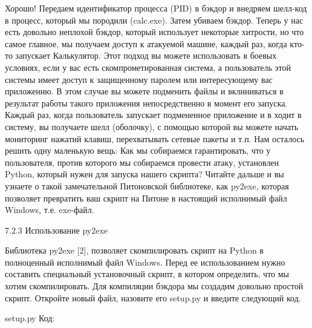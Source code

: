 \documentclass[12pt]{book}
\begin{document}

Хорошо! Передаем идентификатор процесса (PID) в бэкдор и внедряем шелл-код в процесс, который мы породили (calc.exe). Затем убиваем бэкдор. Теперь у нас есть довольно неплохой бэкдор, который использует некоторые хитрости, но что самое главное, мы получаем доступ к атакуемой машине, каждый раз, когда кто-то запускает Калькулятор. Этот подход вы можете использовать в боевых условиях, если у вас есть скомпрометированная система, а пользователь этой системы имеет доступ к защищенному паролем или интересующему вас приложению. В этом случае вы можете подменить файлы и вклиниваться в результат работы такого приложения непосредственно в момент его запуска. Каждый раз, когда пользователь запускает подмененное приложение и в ходит в систему, вы получаете шелл (оболочку), с помощью которой вы можете начать мониторинг нажатий клавиш, перехватывать сетевые пакеты и т.п. Нам осталось решить одну маленькую вещь: Как мы собираемся гарантировать, что у пользователя, против которого мы собираемся провести атаку, установлен Python, который нужен для запуска нашего скрипта? Читайте дальше и вы узнаете о такой замечательной Питоновской библиотеке, как py2exe, которая позволяет превратить ваш скрипт на Питоне в настоящий исполнимый файл Windows, т.е. exe-файл. 

7.2.3 Использование py2exe

Библиотека py2exe [2], позволяет скомпилировать скрипт на Python в полноценный исполнимый файл Windows. Перед ее использованием нужно составить специальный установочный скрипт, в котором определить, что мы хотим скомпилировать. Для компиляции бэкдора мы создадим довольно простой скрипт. Откройте новый файл, назовите его setup.py и введите следующий код.

setup.py
Код:
\end{document}
